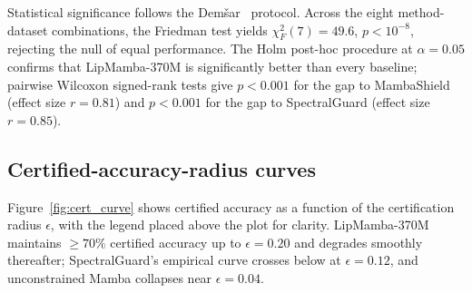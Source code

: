 \documentclass[journal,a4paper,10pt]{IEEEtran}
\theoremstyle{definition}
\theoremstyle{remark}
\newcommand{\modelname}{LipMamba}
\begin{document}
Statistical significance follows the Demšar~\cite{demsar2006statistical} protocol. Across the eight method-dataset combinations, the Friedman test yields $\chi_F^2(7) = 49.6$, $p < 10^{-8}$, rejecting the null of equal performance. The Holm post-hoc procedure at $\alpha = 0.05$ confirms that \modelname{}-370M is significantly better than every baseline; pairwise Wilcoxon signed-rank tests give $p < 0.001$ for the gap to MambaShield (effect size $r = 0.81$) and $p < 0.001$ for the gap to SpectralGuard (effect size $r = 0.85$).

\subsection{Certified-accuracy-radius curves}

Figure~\ref{fig:cert_curve} shows certified accuracy as a function of the certification radius $\epsilon$, with the legend placed above the plot for clarity. \modelname{}-370M maintains $\geq 70\%$ certified accuracy up to $\epsilon = 0.20$ and degrades smoothly thereafter; SpectralGuard's empirical curve crosses below at $\epsilon = 0.12$, and unconstrained Mamba collapses near $\epsilon = 0.04$.
\end{document}
